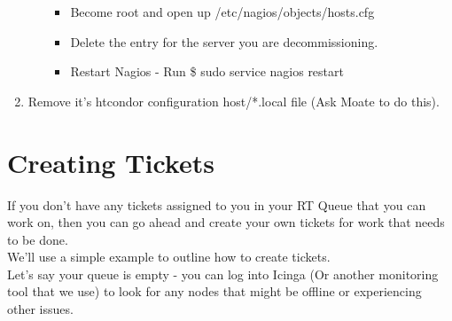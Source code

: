 \documentclass[10pt,letterpaper]{article}
\begin{document}
\begin{enumerate}
\begin{itemize}
\begin{itemize}
                    \item Become root and open up /etc/nagios/objects/hosts.cfg
                    \item Delete the entry for the server you are decommissioning.
                    \item Restart Nagios - Run {\selectfont \$ sudo service nagios restart }
                \end{itemize}
            \end{itemize}
        \item Remove it's htcondor configuration host/*.local file (Ask Moate to do this).
    \end{enumerate}


\clearpage

\section{Creating Tickets}
    If you don't have any tickets assigned to you in your RT Queue that you can
    work on, then you can go ahead and create your own tickets for work that needs
    to be done.\\

    We'll use a simple example to outline how to create tickets.\\

    Let's say your queue is empty - you can log into Icinga (Or another monitoring
    tool that we use) to look for any nodes that might be offline or experiencing
    other issues.
\end{document}
